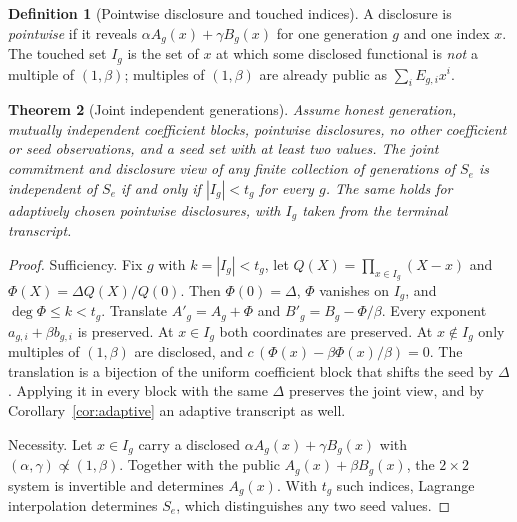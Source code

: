 \documentclass[pdflatex,sn-mathphys-num,twocolumn]{sn-jnl}
\theoremstyle{plain}
\newtheorem{theorem}{Theorem}
\theoremstyle{definition}
\newtheorem{definition}[theorem]{Definition}
\begin{document}
\begin{definition}[Pointwise disclosure and touched indices]
A disclosure is \emph{pointwise} if it reveals $\alpha A_g(x)+\gamma B_g(x)$ for one generation $g$ and one index $x$. The touched set $I_g$ is the set of $x$ at which some disclosed functional is \emph{not} a multiple of $(1,\beta)$; multiples of $(1,\beta)$ are already public as $\sum_iE_{g,i}x^i$.
\end{definition}

\begin{keyresult}
\begin{theorem}[Joint independent generations]\label{thm:generations}
Assume honest generation, mutually independent coefficient blocks, pointwise disclosures, no other coefficient or seed observations, and a seed set with at least two values. The joint commitment and disclosure view of any finite collection of generations of $S_e$ is independent of $S_e$ if and only if $|I_g|<t_g$ for every $g$. The same holds for adaptively chosen pointwise disclosures, with $I_g$ taken from the terminal transcript.
\end{theorem}
\end{keyresult}
\begin{proof}
Sufficiency. Fix $g$ with $k=|I_g|<t_g$, let $Q(X)=\prod_{x\in I_g}(X-x)$ and $\Phi(X)=\Delta Q(X)/Q(0)$. Then $\Phi(0)=\Delta$, $\Phi$ vanishes on $I_g$, and $\deg\Phi\le k<t_g$. Translate $A'_g=A_g+\Phi$ and $B'_g=B_g-\Phi/\beta$. Every exponent $a_{g,i}+\beta b_{g,i}$ is preserved. At $x\in I_g$ both coordinates are preserved. At $x\notin I_g$ only multiples of $(1,\beta)$ are disclosed, and $c\,(\Phi(x)-\beta\Phi(x)/\beta)=0$. The translation is a bijection of the uniform coefficient block that shifts the seed by $\Delta$. Applying it in every block with the same $\Delta$ preserves the joint view, and by Corollary~\ref{cor:adaptive} an adaptive transcript as well.

Necessity. Let $x\in I_g$ carry a disclosed $\alpha A_g(x)+\gamma B_g(x)$ with $(\alpha,\gamma)\not\propto(1,\beta)$. Together with the public $A_g(x)+\beta B_g(x)$, the $2\times2$ system is invertible and determines $A_g(x)$. With $t_g$ such indices, Lagrange interpolation determines $S_e$, which distinguishes any two seed values.
\end{proof}
\end{document}
